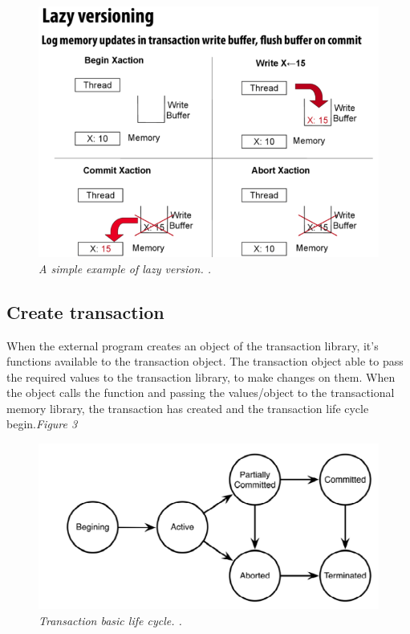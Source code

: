 \documentclass[12pt]{article}
\begin{document}
\begin{figure}[h!]
\centering
\includegraphics[scale=0.4]{Pictures/lazy.png}
\caption{\textit{\color{gray}A simple example of lazy version. \cite{Xelblade}.}}
\end{figure}

\clearpage
\subsection{Create transaction}
When the external program creates an object of the transaction library, it's functions available to the transaction object. The transaction object able to pass the required values to the transaction library, to make changes on them. When the object calls the function and passing the values/object to the transactional memory library, the transaction has created and the transaction life cycle begin.\textit{\color{gray}Figure 3}

\begin{figure}[h!]
\centering
\includegraphics[scale=0.4]{Pictures/begin.png}
\caption{\textit{\color{gray}Transaction basic life cycle. \cite{DLUATM}.}}
\end{figure}
\end{document}
